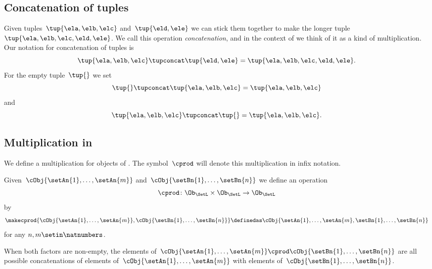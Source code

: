 \subsection{Concatenation of tuples}

Given tuples~$\tup{\ela, \elb, \elc}$ and~$\tup{\eld, \ele}$ we can stick them together to make the longer tuple~$\tup{\ela, \elb, \elc, \eld, \ele}$.
We call this operation \emph{concatenation}, and in the context of \SetL we think of it as a kind of multiplication.
Our notation for concatenation of tuples is
\begin{equation}
    \tup{\ela, \elb, \elc} \tupconcat \tup{\eld, \ele} = \tup{\ela, \elb, \elc, \eld, \ele}.
\end{equation}
For the empty tuple~$\tup{  }$ we set
\begin{equation}
    \tup{} \tupconcat \tup{\ela, \elb, \elc}  = \tup{\ela, \elb, \elc}
\end{equation}
and
\begin{equation}
    \tup{\ela, \elb, \elc}  \tupconcat \tup{ } = \tup{\ela, \elb, \elc}.
\end{equation}

\subsection{Multiplication in \SetL}

We define a multiplication for objects of \SetL.
The symbol~$\cprod$ will denote this multiplication in infix notation.

Given~$\cObj{\setAn{1}, \ldots, \setAn{m}}$ and~$\cObj{\setBn{1}, \ldots, \setBn{n}}$ we define
an operation
\begin{equation}
    \cprod \colon \Ob_{\SetL} \times \Ob_{\SetL} \to \Ob_{\SetL}
\end{equation}
by
\begin{equation}
    \label{eq:strict-monoidal-product-sets}
    \makecprod{
        \cObj{\setAn{1}, \ldots, \setAn{m}},
        \cObj{\setBn{1}, \ldots, \setBn{n}}
    } \definedas \cObj{\setAn{1}, \ldots, \setAn{m}, \setBn{1},  \ldots, \setBn{n}}
\end{equation}
for any $n, m \setin \natnumbers$.

When both factors are non-empty, the elements of~$\cObj{\setAn{1}, \ldots, \setAn{m}} \cprod \cObj{\setBn{1}, \ldots, \setBn{n}}$ are all possible concatenations of elements of~$\cObj{\setAn{1}, \ldots, \setAn{m}}$ with elements of~$\cObj{\setBn{1}, \ldots, \setBn{n}}$.

